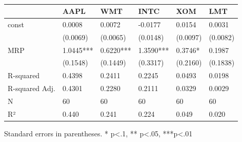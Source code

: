 \begin{table}
\caption{}
\label{}
\begin{center}
\begin{tabular}{llllll}
\hline
               & AAPL      & WMT       & INTC      & XOM      & LMT       \\
\hline
const          & 0.0008    & 0.0072    & -0.0177   & 0.0154   & 0.0031    \\
               & (0.0069)  & (0.0065)  & (0.0148)  & (0.0097) & (0.0082)  \\
MRP            & 1.0445*** & 0.6220*** & 1.3590*** & 0.3746*  & 0.1987    \\
               & (0.1548)  & (0.1449)  & (0.3317)  & (0.2160) & (0.1838)  \\
R-squared      & 0.4398    & 0.2411    & 0.2245    & 0.0493   & 0.0198    \\
R-squared Adj. & 0.4301    & 0.2280    & 0.2111    & 0.0329   & 0.0029    \\
N              & 60        & 60        & 60        & 60       & 60        \\
R²             & 0.440     & 0.241     & 0.224     & 0.049    & 0.020     \\
\hline
\end{tabular}
\end{center}
\end{table}
\bigskip
Standard errors in parentheses. \newline 
* p<.1, ** p<.05, ***p<.01